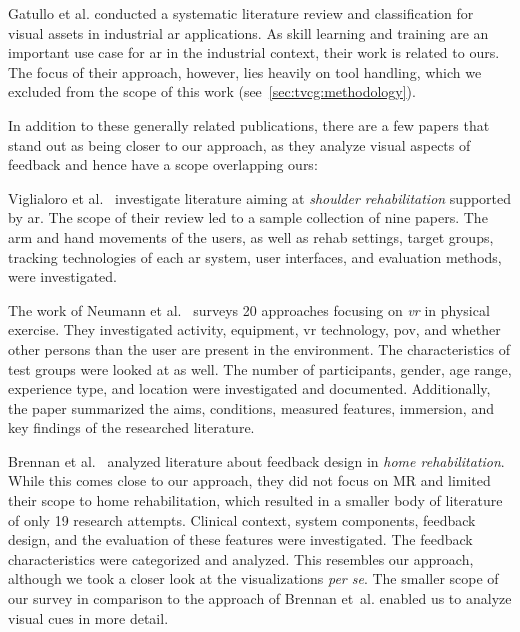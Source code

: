 Gatullo et al.\cite{gatullo2020whw} conducted a systematic literature review and classification for visual assets in industrial \acrshort{ar} applications. As skill learning and training are an important use case for \acrshort{ar} in the industrial context, their work is related to ours. The focus of their approach, however, lies heavily on tool handling, which we excluded from the scope of this work (see~\autoref{sec:tvcg:methodology}).

In addition to these generally related publications, there are a few papers that stand out as being closer to our approach, as they analyze visual aspects of feedback and hence have a scope overlapping ours:

Viglialoro et al.~\cite{viglialoro2019rar} investigate literature aiming at \emph{shoulder rehabilitation} supported by \acrshort{ar}. The scope of their review led to a sample collection of nine papers. The arm and hand movements of the users, as well as rehab settings, target groups, tracking technologies of each \acrshort{ar} system, user interfaces, and evaluation methods, were investigated.

The work of Neumann et al.~\cite{neumann2018sra} surveys 20 approaches focusing on \emph {\acrfull{vr}} in physical exercise. They investigated activity, equipment, \acrshort{vr} technology, \acrshort{pov}, and whether other persons than the user are present in the environment. The characteristics of test groups were looked at as well. The number of participants, gender, age range, experience type, and location were investigated and documented. Additionally, the paper summarized the aims, conditions, measured features, immersion, and key findings of the researched literature.

Brennan et al.~\cite{brennan2019fdt} analyzed literature about feedback design in \emph{home rehabilitation}. While this comes close to our approach, they did not focus on MR and limited their scope to home rehabilitation, which resulted in a smaller body of literature of only 19 research attempts. Clinical context, system components, feedback design, and the evaluation of these features were investigated. The feedback characteristics were categorized and analyzed. This resembles our approach, although we took a closer look at the visualizations \emph{per se}. The smaller scope of our survey in comparison to the approach of Brennan et~al. enabled us to analyze visual cues in more detail.


